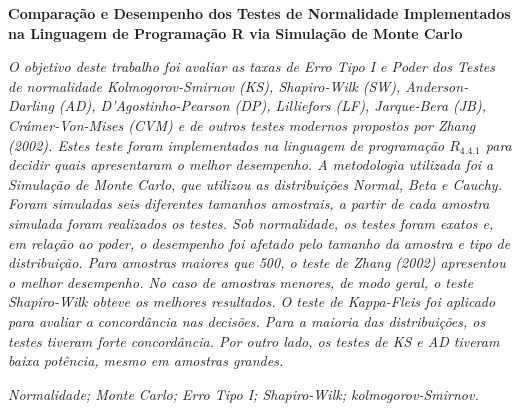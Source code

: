 \documentclass[a4paper,11pt]{article} %
\begin{document}
\pagestyle{fancy}
\setcounter{page}{1}
\renewcommand{\thefootnote}{$\dagger$}
\lfoot{}
\rfoot{}
\setpagewiselinenumbers
\modulolinenumbers[1]
\linenumbers

\begin{center}
    {\large {\bf Comparação e Desempenho dos Testes de Normalidade Implementados na Linguagem de Programação R via Simulação de Monte Carlo}}\vspace{0.3cm} 
\end{center}
\begin{small}
 { \it
    O objetivo deste trabalho foi avaliar as taxas de Erro Tipo I e Poder dos Testes de normalidade Kolmogorov-Smirnov (KS), Shapiro-Wilk (SW), Anderson-Darling (AD), D’Agostinho-Pearson (DP), Lilliefors (LF), Jarque-Bera (JB), Crámer-Von-Mises (CVM) e de outros testes modernos propostos por Zhang (2002). Estes teste foram implementados na linguagem de programação $R_{4.4.1}$ para decidir quais apresentaram o melhor desempenho. A metodologia utilizada foi a Simulação de Monte Carlo, que utilizou as distribuições Normal, Beta e Cauchy. Foram simuladas seis diferentes tamanhos amostrais, a partir de cada amostra simulada foram realizados os testes. Sob normalidade, os testes foram exatos e, em relação ao poder, o desempenho foi afetado pelo tamanho da amostra e tipo de distribuição. Para amostras maiores que 500, o teste de Zhang (2002) apresentou o melhor desempenho. No caso de amostras menores, de modo geral, o teste Shapiro-Wilk obteve os melhores resultados. O teste de Kappa-Fleis foi aplicado para avaliar a concordância nas decisões. Para a maioria das distribuições, os testes tiveram forte concordância. Por outro lado, os testes de KS e AD tiveram baixa potência, mesmo em amostras grandes.
}

\vspace{0.5cm}

 {\it Normalidade; Monte Carlo; Erro Tipo I; Shapiro-Wilk; kolmogorov-Smirnov.}\vspace{0.3cm}
\end{small}
\end{document}
